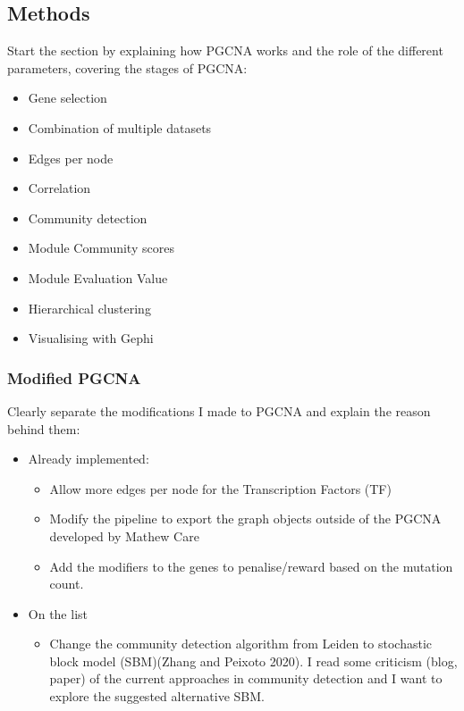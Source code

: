 \subsection{Methods}


Start the section by explaining how PGCNA works and the role of the different parameters, covering the stages of PGCNA:
\begin{itemize}
    \item Gene selection
    \item Combination of multiple datasets
    \item Edges per node
    \item Correlation
    \item Community detection
    \item Module Community scores
    \item Module Evaluation Value
    \item Hierarchical clustering
    \item Visualising with Gephi
\end{itemize}

\subsubsection{Modified PGCNA}

Clearly separate the modifications I made to PGCNA and explain the reason behind them:

\begin{itemize}
    \item Already implemented:
          \begin{itemize}
              \item Allow more edges per node for the Transcription Factors (TF)
              \item Modify the pipeline to export the graph objects outside of the PGCNA developed by Mathew Care
              \item Add the modifiers to the genes to penalise/reward based on the mutation count.
          \end{itemize}
    \item On the list
          \begin{itemize}
              \item Change the community detection algorithm from Leiden to stochastic block model (SBM)(Zhang and Peixoto 2020). I read some criticism (blog, paper) of the current approaches in community detection and I want to explore the suggested alternative SBM.
          \end{itemize}
\end{itemize}


